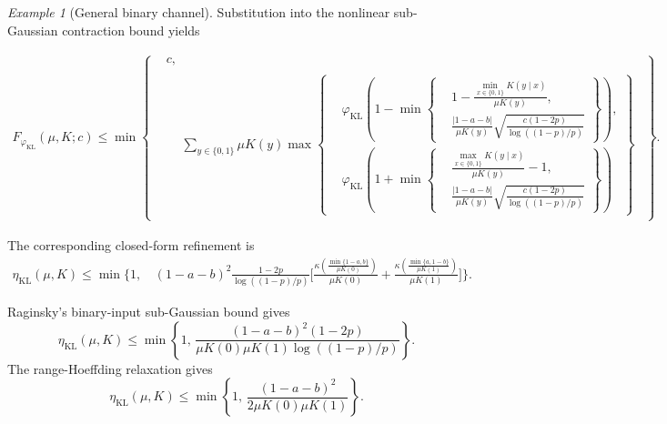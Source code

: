 \documentclass[11pt]{article}
\theoremstyle{plain}
\theoremstyle{remark}
\newtheorem{example}{Example}
\begin{document}
\begin{example}[General binary channel]
Substitution into the nonlinear sub-Gaussian contraction bound yields
\begin{small}
\begin{align}F_{\varphi_{\mathrm{KL}}}(\mu,K;c)\leq
\min\left\{
\begin{aligned}
&c,\\
&\begin{aligned}
&\sum_{y\in\{0,1\}}\mu K(y)
\max\left\{
\begin{aligned}
&\varphi_{\mathrm{KL}}\!\left(
1-
\min\left\{
\begin{aligned}
&1-\frac{\min_{x\in\{0,1\}}K(y\mid x)}{\mu K(y)},\\
&\frac{|1-a-b|}{\mu K(y)}
\sqrt{\frac{c(1-2p)}{\log((1-p)/p)}}
\end{aligned}
\right\}
\right),\\
&\varphi_{\mathrm{KL}}\!\left(
1+
\min\left\{
\begin{aligned}
&\frac{\max_{x\in\{0,1\}}K(y\mid x)}{\mu K(y)}-1,\\
&\frac{|1-a-b|}{\mu K(y)}
\sqrt{\frac{c(1-2p)}{\log((1-p)/p)}}
\end{aligned}
\right\}
\right)
\end{aligned}
\right\}
\end{aligned}
\end{aligned}
\right\}.
\label{eq:generalBinaryNonlinearSubGaussianCurve}
\end{align}
\end{small}
The corresponding closed-form refinement is
\begin{align}
\eta_{\mathrm{KL}}(\mu,K)
\leq
\min\Bigg\{1,\,
&(1-a-b)^2
\frac{1-2p}{\log((1-p)/p)}
\Bigg[
\frac{
\kappa\!\left(
\frac{\min\{1-a,b\}}{\mu K(0)}
\right)
}{\mu K(0)}
+
\frac{
\kappa\!\left(
\frac{\min\{a,1-b\}}{\mu K(1)}
\right)
}{\mu K(1)}
\Bigg]
\Bigg\}.
\label{eq:generalBinaryRefinedSubGaussian}
\end{align}

Raginsky's binary-input sub-Gaussian bound
\cite[Theorem~3.7 and Example~3.3]{sdpiRaginsky} gives
\begin{equation}
\eta_{\mathrm{KL}}(\mu,K)
\leq
\min\left\{
1,\,
\frac{
(1-a-b)^2(1-2p)
}{
\mu K(0)\mu K(1)\log((1-p)/p)
}
\right\}.
\label{eq:generalBinaryRaginskyBound}
\end{equation}
The range-Hoeffding relaxation gives
\begin{equation}
\eta_{\mathrm{KL}}(\mu,K)
\leq
\min\left\{
1,\,
\frac{(1-a-b)^2}
{2\mu K(0)\mu K(1)}
\right\}.
\label{eq:generalBinaryHoeffdingBound}
\end{equation}


\end{example}
\end{document}
